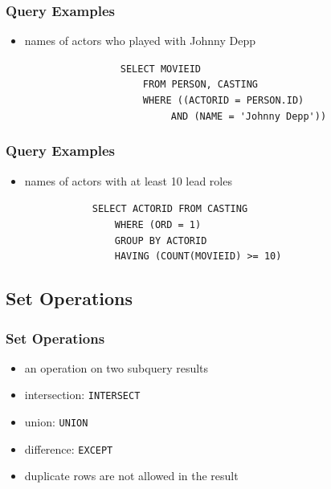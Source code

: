 \documentclass[dvipsnames]{beamer}
\theoremstyle{plain}
\begin{document}
\begin{frame}[fragile]
  \frametitle{Query Examples}

  \begin{itemize}
    \item names of actors who played with Johnny Depp

    \medskip
{}
~~~~~~~~~~~~~~~~~\lstinline!SELECT MOVIEID!\\
~~~~~~~~~~~~~~~~~~~~~\lstinline!FROM PERSON, CASTING!\\
~~~~~~~~~~~~~~~~~~~~~\lstinline!WHERE ((ACTORID = PERSON.ID)!\\
~~~~~~~~~~~~~~~~~~~~~~~~~~\lstinline!AND (NAME = 'Johnny Depp'))!\\
  \end{itemize}
\end{frame}

\begin{frame}[fragile]
  \frametitle{Query Examples}

  \begin{itemize}
    \item names of actors with at least 10 lead roles

    \medskip
{}
~~~~~~~~~~~~\lstinline!SELECT ACTORID FROM CASTING!\\
~~~~~~~~~~~~~~~~\lstinline!WHERE (ORD = 1)!\\
\pause
~~~~~~~~~~~~~~~~\lstinline!GROUP BY ACTORID!\\
\pause
~~~~~~~~~~~~~~~~\lstinline!HAVING (COUNT(MOVIEID) >= 10)!\\
  \end{itemize}
\end{frame}

\subsection{Set Operations}

\begin{frame}
  \frametitle{Set Operations}

  \begin{itemize}
    \item an operation on two subquery results

    \medskip
    \item intersection: \lstinline!INTERSECT!
    \item union: \lstinline!UNION!
    \item difference: \lstinline!EXCEPT!

    \medskip
    \item duplicate rows are not allowed in the result
  \end{itemize}
\end{frame}
\end{document}
